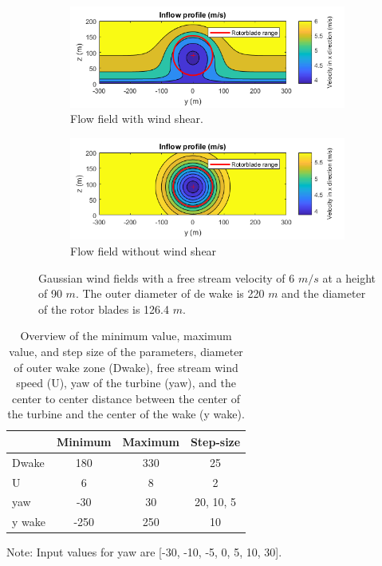 \begin{figure}
	\centering
	\begin{subfigure}[b]{0.50\textwidth}
		\includegraphics[width=\linewidth]{./Figures/PlotwithshearU6D220.png} %
		\caption{Flow field with wind shear.}
		\label{fig:windsh}
	\end{subfigure}
	
	\begin{subfigure}[b]{0.50\textwidth}
		\includegraphics[width=\linewidth]{./Figures/PlotwithoutshearU6D220.png} %
		\caption{Flow field without wind shear}
		\label{fig:nowindsh}
	\end{subfigure}
	
	\caption[Two Gaussian flow fields]{Gaussian wind fields with a free stream velocity of 6 $m/s$ at a height of 90 $m$. The outer diameter of de wake is 220 $m$ and the diameter of the rotor blades is 126.4 $m$.}
	\label{fig:windshear}
\end{figure}




\begin{table}[h]
	\caption{Overview of the minimum value, maximum value, and step size of the parameters, diameter of outer wake zone (Dwake), free stream wind speed (U), yaw of the turbine (yaw), and the center to center distance between the center of the turbine and the center of the wake (y wake).}
	\centering
	\label{tab:pars}
	\begin{tabular}{lccc}
		\hline
	 	& Minimum & Maximum & Step-size \\ 
		\hline
		Dwake & 180 & 330 & 25 \\
		U & 6 & 8 & 2 \\
		yaw & -30 & 30 & 20, 10, 5 \\
		y wake & -250 & 250 & 10 \\
		\hline
	\end{tabular}
Note: Input values for yaw are [-30, -10, -5, 0, 5, 10, 30].
\end{table}

